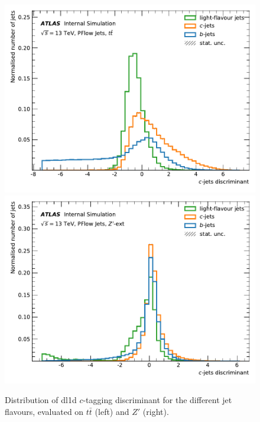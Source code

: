 \begin{center}
\begin{figure}[h!]
{\includegraphics[scale=0.5]{Images/FTAG/Reprocessed/plotting_variables_c/scores_DL1_ttbar_c_299.pdf}
\includegraphics[scale=0.5]{Images/FTAG/Reprocessed/plotting_variables_c/scores_DL1_zprime_c_299.pdf}
}
\caption{Distribution of \gls{dl1d} $c$-tagging discriminant for the different jet flavours, evaluated on $t\bar{t}$ (left) and $Z'$ (right).}
\label{fig:score\gls{dl1d}z}
\end{figure}
\end{center}
%

